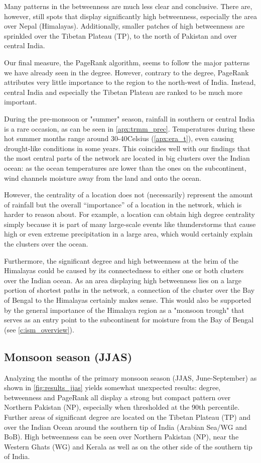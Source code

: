 Many patterns in the betweenness are much less clear and conclusive. There are, however, still spots that display significantly high betweenness, especially the area over Nepal (Himalayas). Additionally, smaller patches of high betweenness are sprinkled over the Tibetan Plateau (TP), to the north of Pakistan and over central India.

Our final measure, the PageRank algorithm, seems to follow the major patterns we have already seen in the degree. However, contrary to the degree, PageRank attributes very little importance to the region to the north-west of India. Instead, central India and especially the Tibetan Plateau are ranked to be much more important.

During the pre-monsoon or "summer" season, rainfall in southern or central India is a rare occasion, as can be seen in \cref{apx:trmm_prec}. Temperatures during these hot summer months range around 30-40\degree Celsius (\cref{apx:era_t}), even causing drought-like conditions in some years. This coincides well with our findings that the most central parts of the network are located in big clusters over the Indian ocean: as the ocean temperatures are lower than the ones on the subcontinent, wind channels moisture away from the land and onto the ocean.

However, the centrality of a location does not (necessarily) represent the amount of rainfall but the overall ``importance'' of a location in the network, which is harder to reason about. For example, a location can obtain high degree centrality simply because it is part of many large-scale events like thunderstorms that cause high or even extreme precipitation in a large area, which would certainly explain the clusters over the ocean.

Furthermore, the significant degree and high betweenness at the brim of the Himalayas could be caused by its connectedness to either one or both clusters over the Indian ocean. As an area displaying high betweenness lies on a large portion of shortest paths in the network, a connection of the cluster over the Bay of Bengal to the Himalayas certainly makes sense. This would also be supported by the general importance of the Himalaya region as a "monsoon trough" that serves as an entry point to the subcontinent for moisture from the Bay of Bengal (see \cref{c:ism_overview}).

\subsection{Monsoon season (JJAS)}
Analyzing the months of the primary monsoon season (JJAS, June-September) as shown in \cref{fig:results_jjas} yields somewhat unexpected results: degree, betweenness and PageRank all display a strong but compact pattern over Northern Pakistan (NP), especially when thresholded at the 90th percentile. Further areas of significant degree are located on the Tibetan Plateau (TP) and over the Indian Ocean around the southern tip of India (Arabian Sea/WG and BoB). High betweenness can be seen over Northern Pakistan (NP), near the Western Ghats (WG) and Kerala as well as on the other side of the southern tip of India.

